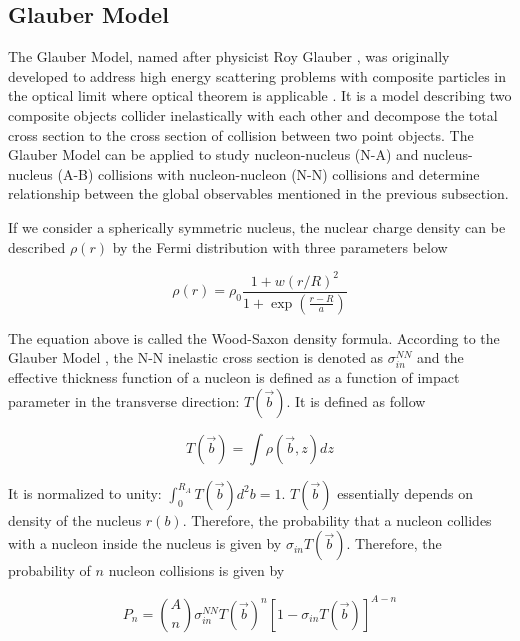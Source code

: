 \subsection{Glauber Model}

The Glauber Model, named after physicist Roy Glauber \cite{Glauber}, was originally developed to address high energy scattering problems with composite particles in the optical limit where optical theorem is applicable \cite{Optical1,Optical2}. It is a model describing two composite objects collider inelastically with each other and decompose the total cross section to the cross section of collision between two point objects. The Glauber Model can be applied to study nucleon-nucleus (N-A) and nucleus-nucleus (A-B) collisions with nucleon-nucleon (N-N) collisions and determine relationship between the global observables mentioned in the previous subsection.    

If we consider a spherically symmetric nucleus, the nuclear charge density can be described $\rho(r)$ by the Fermi distribution with three parameters below

\begin{equation}
\rho(r) = \rho_0 \frac{1 + w(r/R)^2}{1 + \exp({\frac{r-R}{a}})}
\end{equation}

The equation above is called the Wood-Saxon density formula. According to the Glauber Model \cite{Glauber}, the N-N inelastic cross section is denoted as $\sigma_{in}^{NN}$ and the effective thickness function of a nucleon is defined as a function of impact parameter in the transverse direction: $T(\vec{b})$. It is defined as follow

\begin{equation}
T(\vec{b}) =  \int \rho(\vec{b},z) dz 
\end{equation}

It is normalized to unity: $\int^{R_A}_0 T(\vec{b}) d^2b = 1$. $T(\vec{b})$ essentially depends on density of the nucleus $r(b)$. %
Therefore, the probability that a nucleon collides with a nucleon inside the nucleus is given by $\sigma_{in} T(\vec{b})$. Therefore, the probability of $n$ nucleon collisions is given by

\begin{equation}
P_n = {A \choose n} \sigma_{in}^{NN} T(\vec{b})^{n} [1 - \sigma_{in} T(\vec{b})]^{A-n}
\end{equation}

